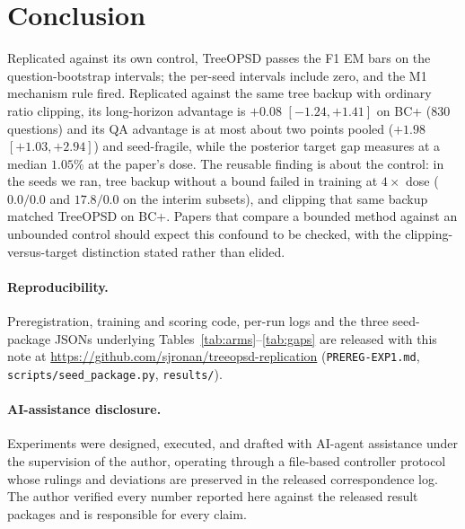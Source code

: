 \documentclass[11pt]{article}
\begin{document}
\section{Conclusion}

Replicated against its own control, TreeOPSD passes the F1 EM bars on
the question-bootstrap intervals; the per-seed intervals include zero,
and the M1 mechanism rule fired.
Replicated against the same tree backup with ordinary ratio clipping,
its long-horizon advantage is $+0.08$ $[-1.24, +1.41]$ on BC+ (830
questions) and its QA advantage is at most about two points pooled
($+1.98$ $[+1.03, +2.94]$) and seed-fragile, while the posterior target
gap measures at a median $1.05\%$ at the paper's dose. The reusable
finding is about the control: in the seeds we ran, tree backup without
a bound failed in training at $4\times$ dose ($0.0/0.0$ and $17.8/0.0$
on the interim subsets), and clipping that same backup matched
TreeOPSD on BC+. Papers that compare a bounded method against an
unbounded control should expect this confound to be checked, with the
clipping-versus-target distinction stated rather than elided.

\paragraph{Reproducibility.} Preregistration, training and scoring code,
per-run logs and the three seed-package JSONs underlying
Tables~\ref{tab:arms}--\ref{tab:gaps} are released with this note at
\url{https://github.com/sjronan/treeopsd-replication}
(\texttt{PREREG-EXP1.md}, \texttt{scripts/seed\_package.py},
\texttt{results/}).

\paragraph{AI-assistance disclosure.} Experiments were designed, executed,
and drafted with AI-agent assistance under the supervision of the author,
operating through a file-based controller protocol whose rulings and
deviations are preserved in the released correspondence log. The author
verified every number reported here against the released result packages
and is responsible for every claim.
\end{document}
